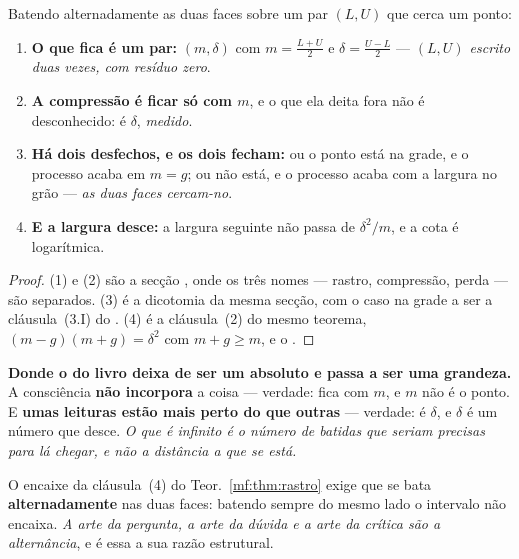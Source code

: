 \documentclass[../livro.tex]{subfiles}
\begin{document}
\begin{teorema}\label{mf:thm:rastro}
Batendo alternadamente as duas faces sobre um par $(L,U)$ que cerca um ponto:
\begin{enumerate}\itemsep3pt
\item[(1)] \textbf{O que fica é um par:} $(m,\delta)$ com $m=\tfrac{L+U}{2}$ e
$\delta=\tfrac{U-L}{2}$ --- \emph{$(L,U)$ escrito duas vezes, com resíduo zero}.
\item[(2)] \textbf{A compressão é ficar só com $m$}, e o que ela deita fora não é
desconhecido: é $\delta$, \emph{medido}.
\item[(3)] \textbf{Há dois desfechos, e os dois fecham:} ou o ponto está na
grade, e o processo acaba em $m=g$; ou não está, e o processo acaba com a largura
no grão --- \emph{as duas faces cercam-no}.
\item[(4)] \textbf{E a largura desce:} a largura seguinte não passa de
$\delta^2/m$, e a cota é logarítmica.
\end{enumerate}
\end{teorema}

\begin{proof}
(1) e (2) são a secção , onde os três nomes --- rastro,
compressão, perda --- são separados. (3) é a dicotomia da mesma secção, com o
caso na grade a ser a cláusula~(3.I) do .
(4) é a cláusula~(2) do mesmo teorema, $(m-g)(m+g)=\delta^2$ com $m+g\ge m$, e o
.
\end{proof}

\medskip\noindent\textbf{Donde o  do livro deixa de ser um
absoluto e passa a ser uma grandeza.} A consciência \textbf{não incorpora} a
coisa --- verdade: fica com $m$, e $m$ não é o ponto. E \textbf{umas leituras
estão mais perto do que outras} --- verdade: é $\delta$, e $\delta$ é um número
que desce. \emph{O que é infinito é o número de batidas que seriam precisas para
lá chegar, e não a distância a que se está.}

\begin{corolario}\label{mf:cor:triade}
O encaixe da cláusula~(4) do Teor.~\ref{mf:thm:rastro} exige que se bata
\textbf{alternadamente} nas duas faces: batendo sempre do mesmo lado o intervalo
não encaixa. \emph{A arte da pergunta, a arte da dúvida e a arte da crítica são a
alternância}, e é essa a sua razão estrutural.
\end{corolario}
\end{document}
